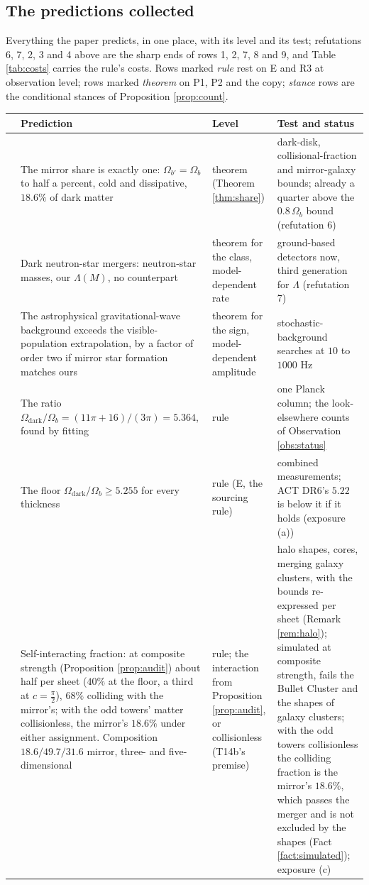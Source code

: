 \documentclass[11pt]{article}
\theoremstyle{definition}
\begin{document}
\subsection*{The predictions collected}

Everything the paper predicts, in one place, with its level and its test; refutations 6, 7, 2, 3 and 4 above are the sharp ends of rows 1, 2, 7, 8 and 9, and Table \ref{tab:costs} carries the rule's costs. Rows marked \emph{rule} rest on E and R3 at observation level; rows marked \emph{theorem} on P1, P2 and the copy; \emph{stance} rows are the conditional stances of Proposition \ref{prop:count}.

\begin{center}\small
\begin{tabular}{>{\raggedright\arraybackslash}p{0.5cm}>{\raggedright\arraybackslash}p{5.2cm}>{\raggedright\arraybackslash}p{2.4cm}>{\raggedright\arraybackslash}p{5.6cm}}
\toprule
& Prediction & Level & Test and status \\
\midrule
1 & The mirror share is exactly one: $\Omega_{b'} = \Omega_{b}$ to half a percent, cold and dissipative, $18.6\%$ of dark matter & theorem (Theorem \ref{thm:share}) & dark-disk, collisional-fraction and mirror-galaxy bounds; already a quarter above the $0.8\,\Omega_{b}$ bound (refutation 6) \\[2pt]
2 & Dark neutron-star mergers: neutron-star masses, our $\Lambda(M)$, no counterpart & theorem for the class, model-dependent rate & ground-based detectors now, third generation for $\Lambda$ (refutation 7) \\[2pt]
3 & The astrophysical gravitational-wave background exceeds the visible-population extrapolation, by a factor of order two if mirror star formation matches ours & theorem for the sign, model-dependent amplitude & stochastic-background searches at $10$ to $1000$ Hz \\[2pt]
4 & The ratio $\Omega_{\mathrm{dark}}/\Omega_{b} = (11\pi + 16)/(3\pi) = 5.364$, found by fitting & rule & one Planck column; the look-elsewhere counts of Observation \ref{obs:status} \\[2pt]
5 & The floor $\Omega_{\mathrm{dark}}/\Omega_{b} \geq 5.255$ for every thickness & rule (E, the sourcing rule) & combined measurements; ACT DR6's $5.22$ is below it if it holds (exposure (a)) \\[2pt]
6 & Self-interacting fraction: at composite strength (Proposition \ref{prop:audit}) about half per sheet ($40\%$ at the floor, a third at $c = \tfrac{\pi}{2}$), $68\%$ colliding with the mirror's; with the odd towers' matter collisionless, the mirror's $18.6\%$ under either assignment. Composition $18.6/49.7/31.6$ mirror, three- and five-dimensional & rule; the interaction from Proposition \ref{prop:audit}, or collisionless (T14b's premise) & halo shapes, cores, merging galaxy clusters, with the bounds re-expressed per sheet (Remark \ref{rem:halo}); simulated at composite strength, fails the Bullet Cluster and the shapes of galaxy clusters; with the odd towers collisionless the colliding fraction is the mirror's $18.6\%$, which passes the merger and is not excluded by the shapes (Fact \ref{fact:simulated}); exposure (c) \\[2pt]

\end{tabular}
\end{center}
\end{document}
